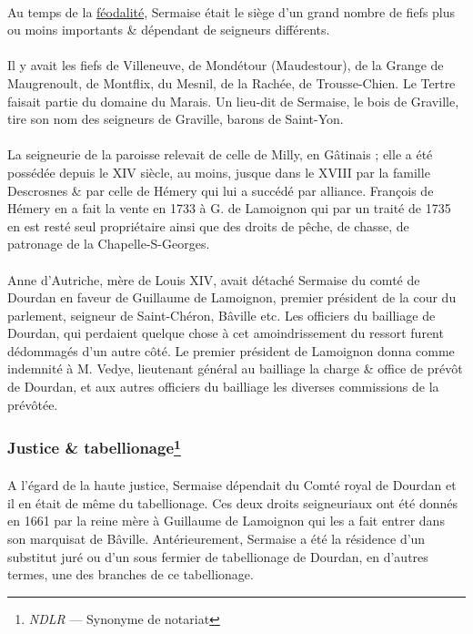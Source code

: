 \documentclass[../eBook.tex]{subfiles}
\begin{document}
    \paragraph{}Au temps de la \underline{féodalité}, Sermaise était le siège d'un grand nombre de fiefs plus ou moins importants \& dépendant de seigneurs différents.
    \paragraph{}Il y avait les fiefs de Villeneuve, de Mondétour (Maudestour), de la Grange de Maugrenoult, de Montflix, du Mesnil, de la Rachée, de Trousse-Chien. Le Tertre faisait partie du domaine du Marais. Un lieu-dit de Sermaise, le bois de Graville, tire son nom des seigneurs de Graville, barons de Saint-Yon.
    \paragraph{}La seigneurie de la paroisse relevait de celle de Milly, en Gâtinais ; elle a été possédée depuis le XIV siècle, au moins, jusque dans le XVIII par la famille Descrosnes \& par celle de Hémery qui lui a succédé par alliance. François de Hémery en a fait la vente en 1733 à G. de Lamoignon qui par un traité de 1735 en est resté seul propriétaire ainsi que des droits de pêche, de chasse, de patronage de la Chapelle-S-Georges.
    \paragraph{}Anne d'Autriche, mère de Louis XIV, avait détaché Sermaise du comté de Dourdan en faveur de Guillaume de Lamoignon, premier président de la cour du parlement, seigneur de Saint-Chéron, Bâville etc. Les officiers du bailliage de Dourdan, qui perdaient quelque chose à cet amoindrissement du ressort furent dédommagés d'un autre côté. Le premier président de Lamoignon donna comme indemnité à M. Vedye, lieutenant général au bailliage la charge \& office de prévôt de Dourdan, et aux autres officiers du bailliage les diverses commissions de la prévôtée.

    \subsubsection*{Justice \& tabellionage\footnote{\textit{NDLR} --- Synonyme de notariat}}
      \paragraph{}A l'égard de la haute justice, Sermaise dépendait du Comté royal de Dourdan et il en était de même du tabellionage. Ces deux droits seigneuriaux ont été donnés en 1661 par la reine mère à Guillaume de Lamoignon qui les a fait entrer dans son marquisat de Bâville. Antérieurement, Sermaise a été la résidence d'un substitut juré ou d'un sous fermier de tabellionage de Dourdan, en d'autres termes, une des branches de ce tabellionage.
\end{document}
